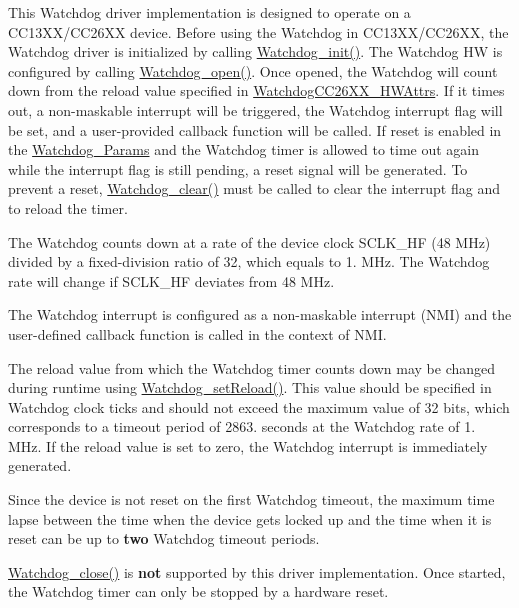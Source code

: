 This Watchdog driver implementation is designed to operate on a C\+C13\+X\+X/\+C\+C26\+X\+X device. Before using the Watchdog in C\+C13\+X\+X/\+C\+C26\+X\+X, the Watchdog driver is initialized by calling \hyperlink{_watchdog_8h_afaadfb59be17661ae95562f2081355e7}{Watchdog\+\_\+init()}. The Watchdog H\+W is configured by calling \hyperlink{_watchdog_8h_aa5ce656aa6d5199e1efdb4ca2cd9fb7c}{Watchdog\+\_\+open()}. Once opened, the Watchdog will count down from the reload value specified in \hyperlink{struct_watchdog_c_c26_x_x___h_w_attrs}{Watchdog\+C\+C26\+X\+X\+\_\+\+H\+W\+Attrs}. If it times out, a non-\/maskable interrupt will be triggered, the Watchdog interrupt flag will be set, and a user-\/provided callback function will be called. If reset is enabled in the \hyperlink{struct_watchdog___params}{Watchdog\+\_\+\+Params} and the Watchdog timer is allowed to time out again while the interrupt flag is still pending, a reset signal will be generated. To prevent a reset, \hyperlink{_watchdog_8h_a396decd6b1807db10c636f9987c3be4c}{Watchdog\+\_\+clear()} must be called to clear the interrupt flag and to reload the timer.

The Watchdog counts down at a rate of the device clock S\+C\+L\+K\+\_\+\+H\+F (48 M\+Hz) divided by a fixed-\/division ratio of 32, which equals to 1. M\+Hz. The Watchdog rate will change if S\+C\+L\+K\+\_\+\+H\+F deviates from 48 M\+Hz.

The Watchdog interrupt is configured as a non-\/maskable interrupt (N\+M\+I) and the user-\/defined callback function is called in the context of N\+M\+I.

The reload value from which the Watchdog timer counts down may be changed during runtime using \hyperlink{_watchdog_8h_a476ef7b9d4e7268717adf94d8505f4a5}{Watchdog\+\_\+set\+Reload()}. This value should be specified in Watchdog clock ticks and should not exceed the maximum value of 32 bits, which corresponds to a timeout period of 2863. seconds at the Watchdog rate of 1. M\+Hz. If the reload value is set to zero, the Watchdog interrupt is immediately generated.

Since the device is not reset on the first Watchdog timeout, the maximum time lapse between the time when the device gets locked up and the time when it is reset can be up to {\bfseries two} Watchdog timeout periods.

\hyperlink{_watchdog_8h_a1c0dfea7011b06f303d01afb631ffbdd}{Watchdog\+\_\+close()} is {\bfseries not} supported by this driver implementation. Once started, the Watchdog timer can only be stopped by a hardware reset.


